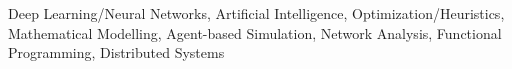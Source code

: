 \small{Deep Learning/Neural Networks, Artificial Intelligence, Optimization/Heuristics,
Mathematical Modelling, Agent-based Simulation, Network Analysis, Functional
Programming, Distributed Systems}